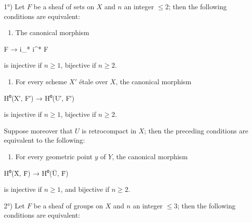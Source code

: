 \documentclass[
]{article}
\newenvironment{Shaded}{}{}
\newcommand{\NormalTok}[1]{#1}
\providecommand{\tightlist}{%
  \setlength{\itemsep}{0pt}\setlength{\parskip}{0pt}}
\begin{document}
1°) Let \(F\) be a sheaf of sets on \(X\) and \(n\) an integer
\(\leqslant 2\); then the following conditions are equivalent:

\begin{enumerate}
\def\labelenumi{(\roman{enumi})}
\tightlist
\item
  The canonical morphism
\end{enumerate}

\begin{Shaded}
\begin{Highlighting}[]
\NormalTok{F → i\_* i\^{}* F}
\end{Highlighting}
\end{Shaded}

is injective if \(n \geqslant 1\), bijective if \(n \geqslant 2\).

\begin{enumerate}
\def\labelenumi{(\roman{enumi})}
\setcounter{enumi}{1}
\tightlist
\item
  For every scheme \(X'\) étale over \(X\), the canonical morphism
\end{enumerate}

\begin{Shaded}
\begin{Highlighting}[]
\NormalTok{H⁰(X′, F′) → H⁰(U′, F′)}
\end{Highlighting}
\end{Shaded}

is injective if \(n \geqslant 1\), bijective if \(n \geqslant 2\).

Suppose moreover that \(U\) is retrocompact in \(X\); then the preceding
conditions are equivalent to the following:

\begin{enumerate}
\def\labelenumi{(\roman{enumi})}
\setcounter{enumi}{2}
\tightlist
\item
  For every geometric point \(y\) of \(Y\), the canonical morphism
\end{enumerate}

\begin{Shaded}
\begin{Highlighting}[]
\NormalTok{H⁰(X̄, F̄) → H⁰(Ū, F̄)}
\end{Highlighting}
\end{Shaded}

is injective if \(n \geqslant 1\), and bijective if \(n \geqslant 2\).

2°) Let \(F\) be a sheaf of groups on \(X\) and \(n\) an integer
\(\leqslant 3\); then the following conditions are equivalent:
\end{document}
